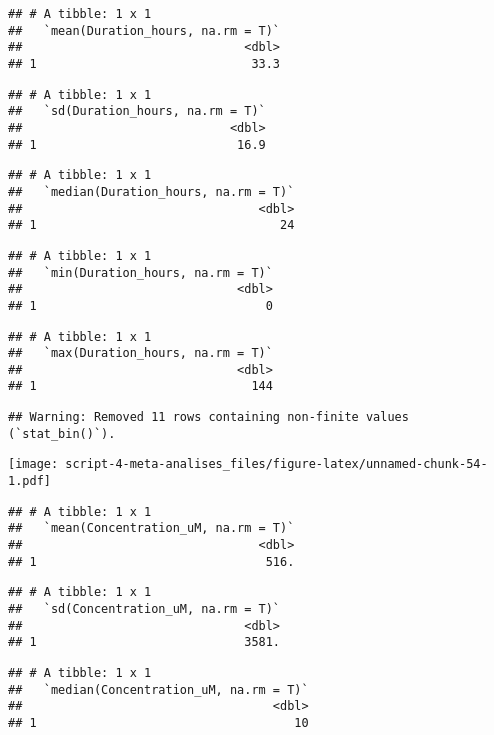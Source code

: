 \documentclass[
]{article}
\begin{document}
\begin{verbatim}
## # A tibble: 1 x 1
##   `mean(Duration_hours, na.rm = T)`
##                               <dbl>
## 1                              33.3
\end{verbatim}

\begin{verbatim}
## # A tibble: 1 x 1
##   `sd(Duration_hours, na.rm = T)`
##                             <dbl>
## 1                            16.9
\end{verbatim}

\begin{verbatim}
## # A tibble: 1 x 1
##   `median(Duration_hours, na.rm = T)`
##                                 <dbl>
## 1                                  24
\end{verbatim}

\begin{verbatim}
## # A tibble: 1 x 1
##   `min(Duration_hours, na.rm = T)`
##                              <dbl>
## 1                                0
\end{verbatim}

\begin{verbatim}
## # A tibble: 1 x 1
##   `max(Duration_hours, na.rm = T)`
##                              <dbl>
## 1                              144
\end{verbatim}

\begin{verbatim}
## Warning: Removed 11 rows containing non-finite values (`stat_bin()`).
\end{verbatim}

\texttt{[image: script-4-meta-analises\_files/figure-latex/unnamed-chunk-54-1.pdf]}

\begin{verbatim}
## # A tibble: 1 x 1
##   `mean(Concentration_uM, na.rm = T)`
##                                 <dbl>
## 1                                516.
\end{verbatim}

\begin{verbatim}
## # A tibble: 1 x 1
##   `sd(Concentration_uM, na.rm = T)`
##                               <dbl>
## 1                             3581.
\end{verbatim}

\begin{verbatim}
## # A tibble: 1 x 1
##   `median(Concentration_uM, na.rm = T)`
##                                   <dbl>
## 1                                    10
\end{verbatim}
\end{document}

